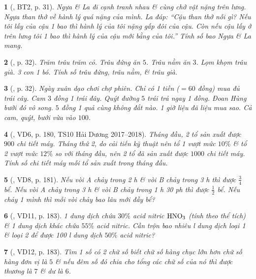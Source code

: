 \documentclass{article}
\newtheorem{baitoan}{}
\begin{document}
\begin{baitoan}[\cite{Binh_boi_duong_Toan_9_tap_2}, BT2, p. 31]
	Ngựa \& La đi cạnh tranh nhau \& cùng chở vật nặng trên lưng. Ngựa than thở về hành lý quá nặng của mình. La đáp: ``Cậu than thở nỗi gì? Nếu tôi lấy của cậu 1 bao thì hành lý của tôi nặng gấp đôi của cậu. Còn nếu cậu lấy ở trên lưng tôi 1 bao thì hành lý của cậu mới bằng của tôi.'' Tính số bao Ngựa \& La mang.
\end{baitoan}

\begin{baitoan}[\cite{Binh_boi_duong_Toan_9_tap_2}, p. 32]
	Trăm trâu trăm cỏ. Trâu đứng ăn $5$. Trâu nằm ăn $3$. Lọm khọm trâu già. 3 con 1 bó. Tính số trâu đứng, trâu nằm, \& trâu già.
\end{baitoan}

\begin{baitoan}[\cite{Binh_boi_duong_Toan_9_tap_2}, p. 32]
	Ngày xuân dạo chơi chợ phiên. Chỉ có 1 tiền ($= 60$ đồng) mua đủ trái cây. Cam $3$ đồng 1 trái đây. Quýt đường $5$ trái trả ngay 1 đồng. Đoan Hùng bưởi đó vô song. $5$ đồng 1 quả cùng không đắt nào. 1 giờ liệu đã liệu mua sao. Cả cam, quýt, bưởi vừa vào $100$.
\end{baitoan}

\begin{baitoan}[\cite{Thu_Viet_Minh_ptb2}, VD6, p. 180, TS10 Hải Dương 2017--2018]
	Tháng đầu, 2 tổ sản xuất được $900$ chi tiết máy. Tháng thứ 2, do cải tiến kỹ thuật nên tổ 1 vượt mức $10\%$ \& tổ 2 vượt mức $12\%$ so với tháng đầu, nên 2 tổ đã sản xuất được $1000$ chi tiết máy. Tính số chi tiết máy mỗi tổ sản xuất trong tháng đầu.
\end{baitoan}

\begin{baitoan}[\cite{Thu_Viet_Minh_ptb2}, VD8, p. 181]
	Nếu vòi A chảy trong {\rm2 h} \& vòi B chảy trong {\rm3 h} thì được $\frac{3}{4}$ bể. Nếu vòi A chảy trong {\rm3 h} \& vòi B chảy trong {\rm1 h 30 ph} thì được $\frac{1}{2}$ bể. Nếu chảy 1 mình thì mỗi vòi chảy bao lâu mới đầy bể?
\end{baitoan}

\begin{baitoan}[\cite{Thu_Viet_Minh_ptb2}, VD11, p. 183]
	1 dung dịch chứa $30\%$ acid nitric $\rm HNO_3$ (tính theo thể tích) \& 1 dung dịch khác chứa $55\%$ acid nitric. Cần trộn bao nhiêu {\rm l} dung dịch loại 1 \& loại 2 để được {\rm100 l} dung dịch $50\%$ acid nitric?
\end{baitoan}

\begin{baitoan}[\cite{Thu_Viet_Minh_ptb2}, VD12, p. 183]
	Tìm 1 số có 2 chữ số biết chữ số hàng chục lớn hơn chữ số hàng đơn vị là $5$ \& nếu đêm số đó chia cho tổng các chữ số của nó thì được thương là $7$ \& dư là $6$.
\end{baitoan}
\end{document}
